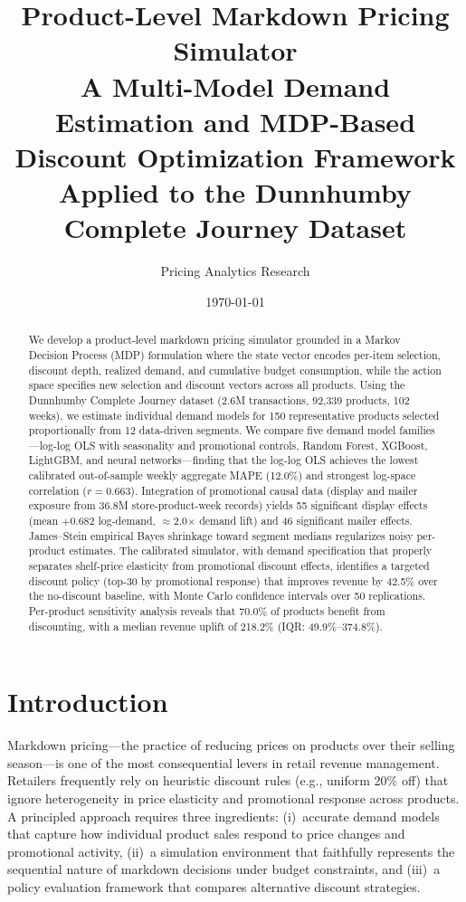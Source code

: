 \documentclass[12pt,a4paper]{article}
\title{%
    \textbf{Product-Level Markdown Pricing Simulator} \\[6pt]
    \large A Multi-Model Demand Estimation and MDP-Based \\
    Discount Optimization Framework \\[6pt]
    \normalsize Applied to the Dunnhumby Complete Journey Dataset
}
\author{Pricing Analytics Research}
\date{\today}
\begin{document}
\maketitle

\begin{abstract}
We develop a product-level markdown pricing simulator grounded in a
Markov Decision Process (MDP) formulation where the state vector
encodes per-item selection, discount depth, realized demand, and
cumulative budget consumption, while the action space specifies new
selection and discount vectors across all products. Using the
Dunnhumby Complete Journey dataset (2.6M transactions, 92,339
products, 102 weeks), we estimate individual demand models for 150
representative products selected proportionally from 12 data-driven
segments. We compare five demand model families---log-log OLS with
seasonality and promotional controls, Random Forest, XGBoost,
LightGBM, and neural networks---finding that the log-log OLS achieves
the lowest calibrated out-of-sample weekly aggregate MAPE (12.0\%) and
strongest log-space correlation ($r = 0.663$). Integration of
promotional causal data (display and mailer exposure from 36.8M
store-product-week records) yields 55 significant display effects
(mean $+0.682$ log-demand, $\approx$2.0$\times$ demand lift) and 46
significant mailer effects. James--Stein empirical Bayes shrinkage
toward segment medians regularizes noisy per-product estimates. The
calibrated simulator, with demand specification that properly
separates shelf-price elasticity from promotional discount effects,
identifies a targeted discount policy (top-30 by promotional response)
that improves revenue by 42.5\% over the no-discount baseline, with
Monte Carlo confidence intervals over 50 replications. Per-product
sensitivity analysis reveals that 70.0\% of products benefit from
discounting, with a median revenue uplift of 218.2\%
(IQR: 49.9\%--374.8\%).
\end{abstract}

\tableofcontents
\newpage

\section{Introduction}
\label{sec:intro}

Markdown pricing---the practice of reducing prices on products over
their selling season---is one of the most consequential levers in
retail revenue management. Retailers frequently rely on heuristic
discount rules (e.g., uniform 20\% off) that ignore heterogeneity in
price elasticity and promotional response across products. A principled
approach requires three ingredients: (i)~accurate demand models that
capture how individual product sales respond to price changes and
promotional activity, (ii)~a simulation environment that faithfully
represents the sequential nature of markdown decisions under budget
constraints, and (iii)~a policy evaluation framework that compares
alternative discount strategies.
\end{document}
